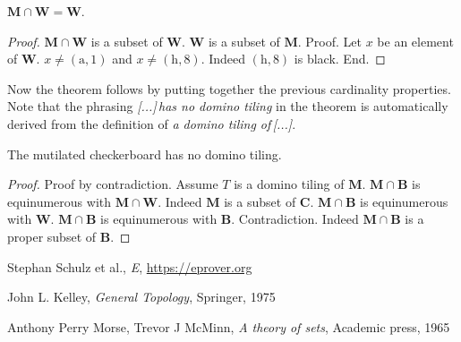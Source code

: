 \documentclass{article}
\newcommand{\fileA}{\mathrm{a}}
\newcommand{\fileH}{\mathrm{h}}
\newcommand{\Checkerboard}{\mathbf{C}}
\newcommand{\Mutilated}{\mathbf{M}}
\newcommand{\Black}{\mathbf{B}}
\newcommand{\White}{\mathbf{W}}
\begin{document}
\begin{forthel}
    \begin{lemma}
        $\Mutilated \cap \White = \White$.
    \end{lemma}
    \begin{proof}
        $\Mutilated \cap \White$ is a subset of $\White$.
        $\White$ is a subset of $\Mutilated$.
        Proof.
            Let $x$ be an element of $\White$.
            $x \neq (\fileA, 1)$ and $x \neq (\fileH,8)$.
            Indeed $(\fileH, 8)$ is black.
        End.
    \end{proof}
\end{forthel}

\noindent Now the theorem follows by putting together the previous cardinality properties.
Note that the phrasing \textit{[...]\,has no domino tiling} in the theorem is automatically
derived from the definition of \textit{a domino tiling of\,[...]}.

\begin{forthel}
    \begin{theorem}
        The mutilated checkerboard has no domino tiling.
    \end{theorem}
    \begin{proof}
        Proof by contradiction.
        Assume $T$ is a domino tiling of $\Mutilated$.
        $\Mutilated \cap \Black$ is equinumerous with $\Mutilated \cap \White$.
        Indeed $\Mutilated$ is a subset of $\Checkerboard$.
        $\Mutilated \cap \Black$ is equinumerous with $\White$.
        $\Mutilated \cap \Black$ is equinumerous with $\Black$.
        Contradiction. Indeed $\Mutilated \cap \Black$ is a proper subset of $\Black$.
    \end{proof}
\end{forthel}

\begin{thebibliography}{1}

 Stephan Schulz et al., \textit{E}, \url{https://eprover.org}

 John L. Kelley, \textit{General Topology}, Springer, 1975

 Anthony Perry Morse, Trevor J McMinn, \textit{A theory of sets}, Academic press, 1965

\end{thebibliography}
\end{document}
